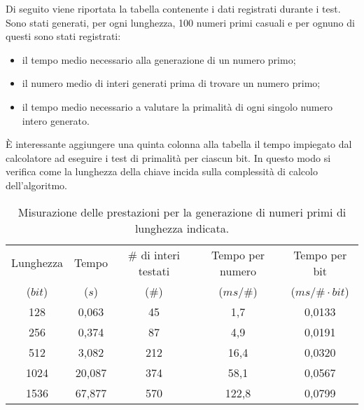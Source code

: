 Di seguito viene riportata la tabella contenente i dati registrati durante i test. Sono stati generati, per ogni lunghezza, 100 numeri primi casuali e per ognuno di questi sono stati registrati:
\begin{itemize}
	\item il tempo medio necessario alla generazione di un numero primo;
	\item il numero medio di interi generati prima di trovare un numero primo;
	\item il tempo medio necessario a valutare la primalità di ogni singolo numero intero generato.
\end{itemize}

È interessante aggiungere una quinta colonna alla tabella il tempo impiegato dal calcolatore ad eseguire i test di primalità per ciascun bit. In questo modo si verifica come la lunghezza della chiave incida sulla complessità di calcolo dell'algoritmo.

\begin{table}[h]
	\label{prestazionePrimi}
	\centering
	\begin{tabular}{ccccc}
		\toprule
		Lunghezza & Tempo & \# di interi testati & Tempo per numero & Tempo per bit \\
		($bit$) & ($s$) & (\#) & ($ms / \text{\#}$) & ($ms / \text{\#} \cdot bit$) \\
		\midrule
		128 & 0,063 & 45 & 1,7 & 0,0133 \\
		256 & 0,374 & 87 & 4,9 & 0,0191 \\
		512 & 3,082 & 212 & 16,4 & 0,0320 \\
		1024 & 20,087 & 374 & 58,1 & 0,0567 \\
		1536 & 67,877 & 570 & 122,8 & 0,0799 \\
		\bottomrule
	\end{tabular}
	\caption{Misurazione delle prestazioni per la generazione di numeri primi di lunghezza indicata.}
\end{table}

